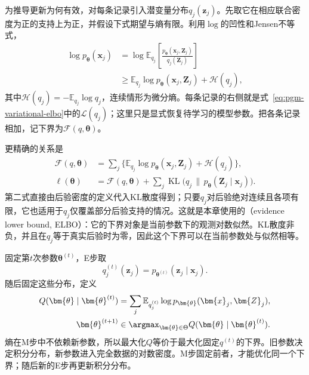 为推导更新为何有效，对每条记录引入潜变量分布$q_j(\bm{z}_j)$。先取它在相应联合密度为正的支持上为正，并假设下式期望与熵有限。利用$\log$的凹性和Jensen不等式，
\begin{equation}
  \begin{aligned}
    \log p_{\bm{\theta}}(\bm{x}_j)
      &=\log\mathbb{E}_{q_j}
        \left[\frac{p_{\bm{\theta}}(\bm{x}_j,\bm{Z}_j)}
                    {q_j(\bm{Z}_j)}\right]\\
      &\geq
        \mathbb{E}_{q_j}\log p_{\bm{\theta}}
             (\bm{x}_j,\bm{Z}_j)+\mathcal{H}(q_j),
  \end{aligned}
  \label{eq:pgm-parameter-learning-jensen}
\end{equation}
其中$\mathcal{H}(q_j)=-\mathbb{E}_{q_j}\log q_j$，连续情形为微分熵。每条记录的右侧就是式~\eqref{eq:pgm-variational-elbo}中的$\mathcal{L}(q_j)$；这里只是显式恢复待学习的模型参数。把各条记录相加，记下界为$\mathcal{F}(q,\bm{\theta})$。

更精确的关系是
\begin{equation}
  \begin{aligned}
    \mathcal{F}(q,\bm{\theta})
      &=\sum_j\{\mathbb{E}_{q_j}
          \log p_{\bm{\theta}}(\bm{x}_j,\bm{Z}_j)
                      +\mathcal{H}(q_j)\},\\
    \ell(\bm{\theta})
      &=\mathcal{F}(q,\bm{\theta})
        +\sum_j\operatorname{KL}
          \bigl(q_j\,\|\,p_{\bm{\theta}}(\bm{Z}_j\mid\bm{x}_j)\bigr).
  \end{aligned}
  \label{eq:pgm-parameter-learning-elbo-identity}
\end{equation}
第二式直接由后验密度的定义代入KL散度得到；只要$q_j$对后验绝对连续且各项有限，它也适用于$q_j$仅覆盖部分后验支持的情况。这就是本章使用的（evidence lower bound, ELBO）：它的下界对象是当前参数下的观测对数似然。KL散度非负，并且在$q_j$等于真实后验时为零，因此这个下界可以在当前参数处与似然相等。

固定第$t$次参数$\bm{\theta}^{(t)}$，E步取
\[
  q_j^{(t)}(\bm{z}_j)
    =p_{\bm{\theta}^{(t)}}(\bm{z}_j\mid\bm{x}_j).
\]
随后固定这些分布，定义
\begin{equation}
  \begin{aligned}
    Q(\bm{\theta}\mid\bm{\theta}^{(t)})
      &=\sum_j\mathbb{E}_{q_j^{(t)}}
          \log p_{\bm{\theta}}(\bm{x}_j,\bm{Z}_j),\\
    \bm{\theta}^{(t+1)}
      &\in\argmax_{\bm{\theta}\in\Theta}
         Q(\bm{\theta}\mid\bm{\theta}^{(t)}).
  \end{aligned}
  \label{eq:pgm-parameter-learning-em-update}
\end{equation}
熵在M步中不依赖新参数，所以最大化$Q$等价于最大化固定$q^{(t)}$的下界。旧参数决定积分分布，新参数进入完全数据的对数密度。M步固定前者，才能优化同一个下界；随后新的E步再更新积分分布。

